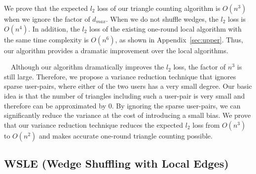 We prove that the expected $l_2$ loss of our triangle counting algorithm is 
$O(n^3)$ when we ignore the factor of $d_{max}$. 
When we do not shuffle wedges, the 
$l_2$ loss is 
$O(n^4)$. 
In addition, the $l_2$ loss of the existing one-round local algorithm \cite{Imola_USENIX22} with the same time complexity is $O(n^6)$, as shown in 
Appendix~\ref{sec:upper}. 
Thus, our 
algorithm 
provides a dramatic improvement over the local algorithms. 

\smallskip
{}~~Although our 
algorithm 
dramatically 
improves 
the $l_2$ loss, the factor of $n^3$ is still large. 
Therefore, we propose a variance reduction technique that ignores sparse user-pairs, where either of the two users has a very small degree. 
Our basic idea is that the number of triangles including such a user-pair is very small 
and therefore can be approximated by $0$. 
By ignoring the sparse user-pairs, we can significantly reduce the variance at the cost of introducing a small bias. 
We prove that our variance reduction technique reduces the expected $l_2$ loss from $O(n^3)$ to $O(n^2)$ and makes accurate one-round triangle counting possible. 

\subsection{WSLE (Wedge Shuffling with Local Edges)}
\label{sub:wedge}

